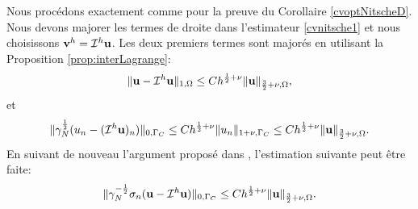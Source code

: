 \documentclass[11pt]{book}
\def\u{{\bf u}}
\def\vv{{\bf v}}
\def\V{{\bf V}}
\newcommand{\caI}{{\cal I}}
\newcommand{\sn}{{\sigma_n}}
\newcommand{\gN}{\gamma_{N}}
\begin{document}
\proof
Nous procédons exactement comme pour la preuve du Corollaire  \ref{cvoptNitscheD}.
Nous devons majorer les termes de droite dans l'estimateur \eqref{cvnitsche1} et nous choisissons $\vv^h = \caI^h \u$. %
Les deux premiers termes sont majorés en utilisant la Proposition \ref{prop:interLagrange}:
\begin{equation}
  \| \u - \caI^h \u \|_{1,\Omega} \leq C h^{\frac12+\nu}  \| \u \|_{\frac32+\nu,\Omega},\label{esti1}
\end{equation}
%
et
\begin{equation}
\Vert\gN^{\frac{1}{2}}( u_n - (\caI^h \u)_n  )\Vert_{0,\Gamma_C} \le C h^{\frac12+\nu}  \Vert u_n
  \Vert_{1+\nu,\Gamma_C}
  \le C h^{\frac12+\nu} \Vert \u \Vert_{\frac32+\nu,\Omega}. \label{esti2}
\end{equation}
%
%
%
En suivant de nouveau l'argument proposé dans \cite{fritz-hueber-wohlmuth-04,fritz-hueber-wohlmuth-03}, l'estimation suivante peut être faite: %
\begin{equation}
\| \gN^{-\frac12} \sn(\u - \caI^h \u) \|_{0,\Gamma_C}
\leq C h^{\frac12+\nu} \| \u \|_{\frac32+\nu,\Omega}. \label{esti3}
\end{equation}
\end{document}
